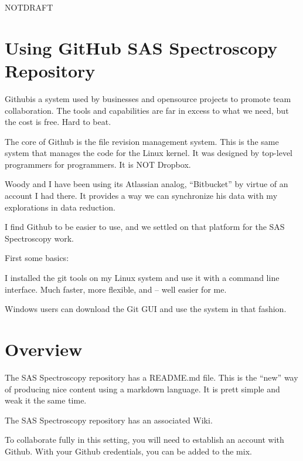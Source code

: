 \documentclass[letter,11pt,oneside]{article}
\def\documentisdraft{NOTDRAFT}
\begin{document}

\setcounter{section}{0}

\ifx\documentisdraft\drafttest
\linenumbers    %
\fi

\section{Using GitHub SAS Spectroscopy Repository}

Github\texttrademark is a system used by businesses and
opensource projects to promote team collaboration. The
tools and capabilities are far in excess to what we need,
but the cost is free. Hard to beat.

The core of Github is the file revision management system. This
is the same system that manages the code for the Linux kernel.
It was designed by top-level programmers for programmers. It is
NOT Dropbox\texttrademark. 

Woody and I have been using its Atlassian analog, ``Bitbucket''\texttrademark
by virtue of an account I had there. It provides a way we can
synchronize his data with my explorations in data reduction.

I find Github to be easier to use, and we settled on that platform
for the SAS Spectroscopy work.

First some basics:

I installed the git tools on my Linux system and use it with
a command line interface. Much faster, more flexible, and --
well easier for me.

Windows users can download the Git GUI and use the system in that fashion.



\section{Overview}

The SAS Spectroscopy repository has a README.md file. This is the ``new''
way of producing nice content using a markdown language. It is prett
simple and weak it the same time.

The SAS Spectroscopy repository has an associated Wiki.

To collaborate fully in this setting, you will need to establish
an account with Github. With your Github credentials, you can
be added to the mix.
\end{document}

